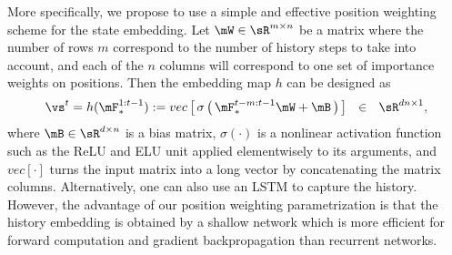 \documentclass{article} %
\begin{document}
More specifically, we propose to use a simple and effective position weighting scheme for the state embedding. Let $\mW \in \sR^{m\times n}$ be a matrix where the number of rows $m$ correspond to the number of history steps to take into account, and each of the $n$ columns will correspond to one set of importance weights on positions. Then the embedding map $h$ can be designed as
{\small \begin{equation}
    \label{eq:state_embedding}
    \vs^t = h(\mF^{1:t-1}_\ast) := vec \left[\, \sigma \left(\, \mF_*^{t-m:t-1} \mW + \mB \,\right)\, \right]~~\in~~\sR^{dn\times 1},
\end{equation}}
where $\mB\in \sR^{d\times n}$ is a bias matrix, $\sigma(\cdot)$ is a nonlinear activation function such as the ReLU and ELU unit applied elementwisely to its arguments, and $vec[\cdot]$ turns the input matrix into a long vector by concatenating the matrix columns.
Alternatively, one can also use an LSTM to capture the history. However, the advantage of our position weighting parametrization is that the history embedding is obtained by a shallow network which is more efficient for forward computation and gradient backpropagation than recurrent networks.
\end{document}
